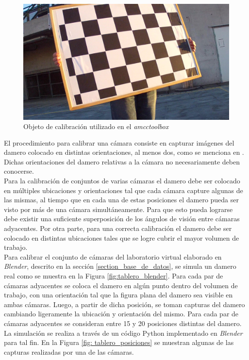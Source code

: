 \begin{figure}[ht!]
\begin{center}
\includegraphics[scale=0.075]{img/calibracion/tablero.jpg}
\end{center}
\caption{Objeto de calibración utilizado en el \textit{amcctoolbox}}
\label{fig: tablero}
\end{figure}


El procedimiento para calibrar una cámara consiste en capturar imágenes del damero colocado en distintas orientaciones, al menos dos, como se menciona en \cite{zhang_articulo}. Dichas orientaciones del damero relativas a la cámara no necesariamente deben conocerse.\\

Para la calibración de conjuntos de varias cámaras el damero debe ser colocado en múltiples ubicaciones y orientaciones tal que cada cámara capture algunas de las mismas, al tiempo que en cada una de estas posiciones el damero pueda ser visto por más de una cámara simultáneamente. Para que esto pueda lograrse debe existir una suficiente superposición de los ángulos de visión entre cámaras adyacentes. Por otra parte, para una correcta calibración el damero debe ser colocado en distintas ubicaciones tales que se logre cubrir el mayor volumen de trabajo.\\

Para calibrar el conjunto de cámaras del laboratorio virtual elaborado en \emph{Blender}, descrito en la sección \ref{section_base_de_datos}, se simula un damero real como se muestra en la Figura \ref{fig:tablero_blender}. Para cada par de cámaras adyacentes se coloca el damero en algún punto dentro del volumen de trabajo, con una orientación tal que la figura plana del damero sea visible en ambas cámaras. Luego, a partir de dicha posición, se toman capturas del damero cambiando ligeramente la ubicación y orientación del mismo. Para cada par de cámaras adyacentes se consideran entre 15 y 20 posiciones distintas del damero. La simulación se realiza a través de un código Python implementado en \emph{Blender} para tal fin. En la Figura \ref{fig: tablero_posiciones} se muestran algunas de las capturas realizadas por una de las cámaras. 


